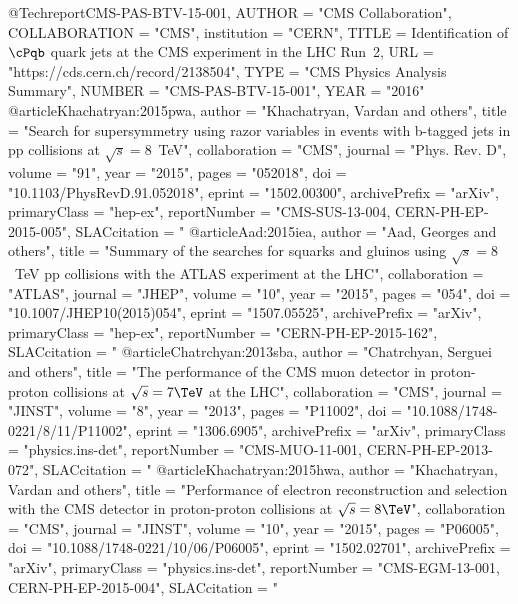 @Techreport{CMS-PAS-BTV-15-001,
      AUTHOR      = "{CMS Collaboration}",
      COLLABORATION = "{CMS}",
      institution    = "CERN",
      TITLE       = {Identification of $\cPqb$ quark jets at the CMS experiment
                     in the LHC Run~2},
      URL         = "https://cds.cern.ch/record/2138504",
      TYPE        = "CMS Physics Analysis Summary",
      NUMBER      = "CMS-PAS-BTV-15-001",
      YEAR        = "2016"
}
@article{Khachatryan:2015pwa,
      author         = "Khachatryan, Vardan and others",
      title          = "{Search for supersymmetry using razor variables in events
                        with b-tagged jets in pp collisions at $\sqrt{s} =8$~TeV}",
      collaboration  = "CMS",
      journal        = "Phys. Rev. D",
      volume         = "91",
      year           = "2015",
      pages          = "052018",
      doi            = "10.1103/PhysRevD.91.052018",
      eprint         = "1502.00300",
      archivePrefix  = "arXiv",
      primaryClass   = "hep-ex",
      reportNumber   = "CMS-SUS-13-004, CERN-PH-EP-2015-005",
      SLACcitation   = "%
}
@article{Aad:2015iea,
      author         = "Aad, Georges and others",
      title          = "{Summary of the searches for squarks and gluinos using
                        $\sqrt{s}=8$~TeV pp collisions with the ATLAS experiment
                        at the LHC}",
      collaboration  = "ATLAS",
      journal        = "JHEP",
      volume         = "10",
      year           = "2015",
      pages          = "054",
      doi            = "10.1007/JHEP10(2015)054",
      eprint         = "1507.05525",
      archivePrefix  = "arXiv",
      primaryClass   = "hep-ex",
      reportNumber   = "CERN-PH-EP-2015-162",
      SLACcitation   = "%
}
@article{Chatrchyan:2013sba,
      author         = "Chatrchyan, Serguei and others",
      title          = "{The performance of the CMS muon detector in
                        proton-proton collisions at $\sqrt{s} = 7\TeV$ at the LHC}",
      collaboration  = "CMS",
      journal        = "JINST",
      volume         = "8",
      year           = "2013",
      pages          = "P11002",
      doi            = "10.1088/1748-0221/8/11/P11002",
      eprint         = "1306.6905",
      archivePrefix  = "arXiv",
      primaryClass   = "physics.ins-det",
      reportNumber   = "CMS-MUO-11-001, CERN-PH-EP-2013-072",
      SLACcitation   = "%
}
@article{Khachatryan:2015hwa,
      author         = "Khachatryan, Vardan and others",
      title          = "{Performance of electron reconstruction and selection
                        with the CMS detector in proton-proton collisions at
                        $\sqrt{s}= 8\TeV$}",
      collaboration  = "CMS",
      journal        = "JINST",
      volume         = "10",
      year           = "2015",
      pages          = "P06005",
      doi            = "10.1088/1748-0221/10/06/P06005",
      eprint         = "1502.02701",
      archivePrefix  = "arXiv",
      primaryClass   = "physics.ins-det",
      reportNumber   = "CMS-EGM-13-001, CERN-PH-EP-2015-004",
      SLACcitation   = "%
}
